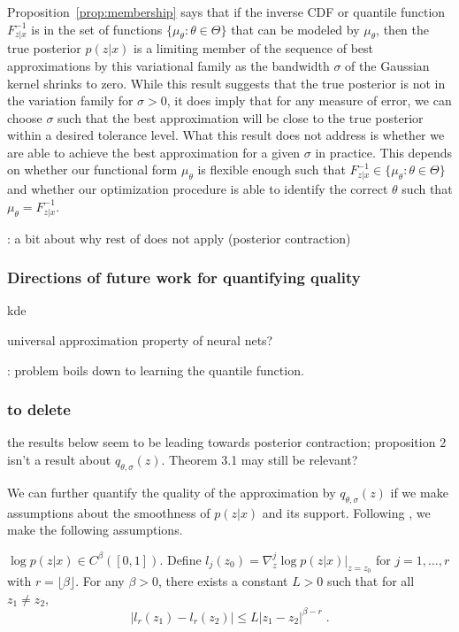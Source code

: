 \documentclass[10pt]{article}
\begin{document}
Proposition~\ref{prop:membership} says that if the inverse CDF or quantile function $F_{z|x}^{-1}$ is in the set of functions $\{\mu_\theta:\theta\in\Theta\}$ that can be modeled by $\mu_\theta$, then the true posterior $p(z|x)$ is a limiting member of the sequence of best approximations by this variational family as the bandwidth $\sigma$ of the Gaussian kernel shrinks to zero. While this result suggests that the true posterior is not in the variation family for $\sigma>0$, it does imply that for any measure of error, we can choose $\sigma$ such that the best approximation will be close to the true posterior within a desired tolerance level. What this result does not address is whether we are able to achieve the best approximation for a given $\sigma$ in practice. This depends on whether our functional form $\mu_\theta$ is flexible enough such that $F_{z|x}^{-1}\in\{\mu_\theta:\theta\in\Theta\}$ and whether our optimization procedure is able to identify the correct $\theta$ such that $\mu_\theta=F_{z|x}^{-1}$.

\todo: a bit about why rest of \citet{Plummer:2021} does not apply (posterior contraction)

\subsubsection{Directions of future work for quantifying quality}

\todo kde

\todo universal approximation property of neural nets?


\todo: problem boils down to learning the quantile function. 

\subsubsection{\todo to delete}

\todo the results below seem to be leading towards posterior contraction; proposition 2 isn't a result about $q_{\theta,\sigma}(z)$. Theorem 3.1 may still be relevant?

We can further quantify the quality of the approximation by $q_{\theta,\sigma}(z)$ if we make assumptions about the smoothness of $p(z|x)$ and its support. Following \citet{Plummer:2021}, we make the following assumptions.

\begin{assumption} \label{asp:p1}
$\log p(z|x) \in C^\beta([0,1])$. Define $l_j(z_0) = \nabla_z^j\log p(z|x)\big|_{z=z_0}$ for $j=1,\ldots,r$ with $r=\lfloor\beta\rfloor$. For any $\beta>0$, there exists a constant $L>0$ such that for all $z_1\neq z_2$,
\[
|l_r(z_1)-l_r(z_2)| \leq L|z_1-z_2|^{\beta-r} \;.
\]
\end{assumption}
\end{document}

